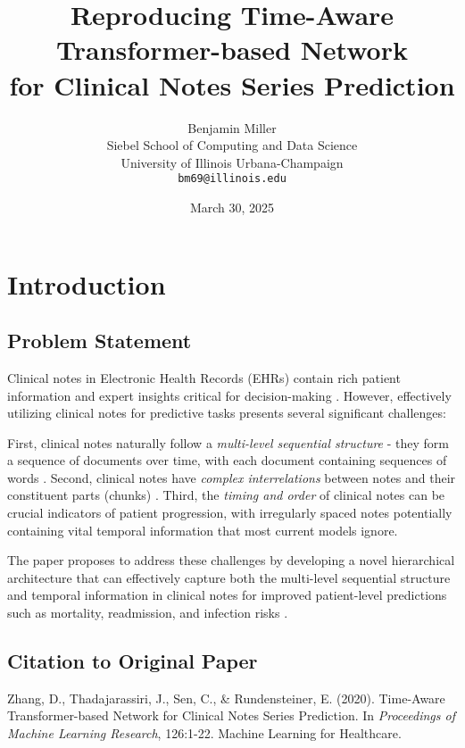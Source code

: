 \documentclass[10pt,letterpaper,twocolumn]{article}
\title{\textbf{Reproducing Time-Aware Transformer-based Network\\for Clinical Notes Series Prediction}}
\author{Benjamin Miller \\
Siebel School of Computing and Data Science \\
University of Illinois Urbana-Champaign \\
\texttt{bm69@illinois.edu}}
\date{March 30, 2025}
\begin{document}
\twocolumn[
  \begin{@twocolumnfalse}
	\vspace{-0.6in}
    \maketitle
    \thispagestyle{empty}
  \end{@twocolumnfalse}
]

\section{Introduction}

\subsection{Problem Statement}
Clinical notes in Electronic Health Records (EHRs) contain rich patient information and expert insights critical for decision-making \cite{johnson2016mimic}. However, effectively utilizing clinical notes for predictive tasks presents several significant challenges:

First, clinical notes naturally follow a \textit{multi-level sequential structure} - they form a sequence of documents over time, with each document containing sequences of words \cite{sen2019patient}. Second, clinical notes have \textit{complex interrelations} between notes and their constituent parts (chunks) \cite{huang2019clinicalbert}. Third, the \textit{timing and order} of clinical notes can be crucial indicators of patient progression, with irregularly spaced notes potentially containing vital temporal information that most current models ignore.

The paper proposes to address these challenges by developing a novel hierarchical architecture that can effectively capture both the multi-level sequential structure and temporal information in clinical notes for improved patient-level predictions such as mortality, readmission, and infection risks \cite{zhang2020time}.

\subsection{Citation to Original Paper}
Zhang, D., Thadajarassiri, J., Sen, C., \& Rundensteiner, E. (2020). Time-Aware Transformer-based Network for Clinical Notes Series Prediction\cite{zhang2020time}. In \textit{Proceedings of Machine Learning Research}, 126:1-22. Machine Learning for Healthcare.
\end{document}
